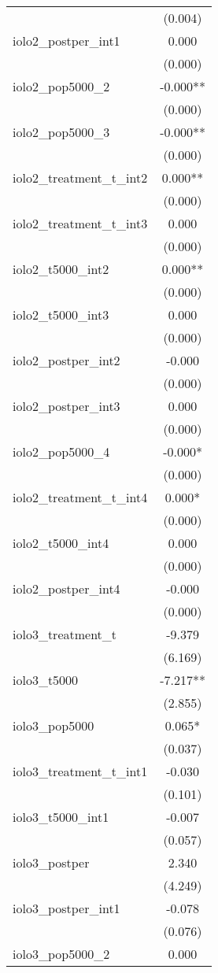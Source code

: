 \documentclass[]{article}
\begin{document}
\begin{tabular}{lc}
 & (0.004) \\
iolo2\_postper\_int1 & 0.000 \\
 & (0.000) \\
iolo2\_pop5000\_2 & -0.000** \\
 & (0.000) \\
iolo2\_pop5000\_3 & -0.000** \\
 & (0.000) \\
iolo2\_treatment\_t\_int2 & 0.000** \\
 & (0.000) \\
iolo2\_treatment\_t\_int3 & 0.000 \\
 & (0.000) \\
iolo2\_t5000\_int2 & 0.000** \\
 & (0.000) \\
iolo2\_t5000\_int3 & 0.000 \\
 & (0.000) \\
iolo2\_postper\_int2 & -0.000 \\
 & (0.000) \\
iolo2\_postper\_int3 & 0.000 \\
 & (0.000) \\
iolo2\_pop5000\_4 & -0.000* \\
 & (0.000) \\
iolo2\_treatment\_t\_int4 & 0.000* \\
 & (0.000) \\
iolo2\_t5000\_int4 & 0.000 \\
 & (0.000) \\
iolo2\_postper\_int4 & -0.000 \\
 & (0.000) \\
iolo3\_treatment\_t & -9.379 \\
 & (6.169) \\
iolo3\_t5000 & -7.217** \\
 & (2.855) \\
iolo3\_pop5000 & 0.065* \\
 & (0.037) \\
iolo3\_treatment\_t\_int1 & -0.030 \\
 & (0.101) \\
iolo3\_t5000\_int1 & -0.007 \\
 & (0.057) \\
iolo3\_postper & 2.340 \\
 & (4.249) \\
iolo3\_postper\_int1 & -0.078 \\
 & (0.076) \\
iolo3\_pop5000\_2 & 0.000 \\

\end{tabular}
\end{document}
